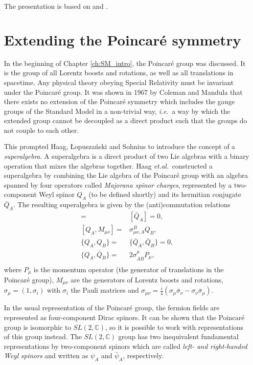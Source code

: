 The presentation is based on \cite{Batzing:2013} and \cite{Leinonen:2014}.

\section{Extending the Poincar\'{e} symmetry}
In the beginning of Chapter \ref{ch:SM_intro}, the Poincar\'{e} group was discussed. It is the group of all Lorentz boosts and rotations, as well as all translations in spacetime. Any physical theory obeying Special Relativity must be invariant under the Poincar\'{e} group. It was shown in 1967 by Coleman and Mandula \cite{PhysRev.159.1251} that there exists no extension of the Poincar\'{e} symmetry which includes the gauge groups of the Standard Model in a non-trivial way, {\it i.e.}\ a way by which the extended group cannot be decoupled as a direct product such that the groups do not couple to each other. 

This prompted Haag, \L{}opusza\'{n}ski and Sohnius \cite{Haag1975257} to introduce the concept of a {\it superalgebra}. A superalgebra is a direct product of two Lie algebras with a binary operation that mixes the algebras together. Haag {\it et.al.}\ constructed a superalgebra by combining the Lie algebra of the Poincar\'{e} group with an algebra spanned by four operators called {\it Majorana spinor charges}, represented by a two-component Weyl spinor $Q_A$ (to be defined shortly) and its hermitian conjugate $\bar Q_{\dot A}$. The resulting superalgebra is given by the (anti)commutation relations
\begin{align}
	[Q_A,P_\mu] =& [\bar Q_{\dot A}] = 0,\\
	[Q_A, M_{\mu\nu}] =& \sigma_{\mu\nu,A}^B Q_B,\\
	\{Q_A, Q_B\} =& \{\bar Q_{\dot A}, \bar Q_{\dot B} \} = 0,\\
	\{Q_A, \bar Q_{\dot B} \} =& 2\sigma^\mu_{A \dot B} P_\mu,\\
\end{align}
where $P_\mu$ is the momentum operator (the generator of translations in the Poincar\'{e} group), $M_{\mu\nu}$ are the generators of Lorentz boosts and rotations, $\sigma_\mu = (1,\sigma_i)$ with $\sigma_i$ the Pauli matrices and $\sigma_{\mu\nu} = \frac{i}{4}(\sigma_\mu \bar\sigma_\nu - \sigma_\nu \bar\sigma_\mu)$. 

In the usual representation of the Poincar\'{e} group, the fermion fields are represented as four-component Dirac spinors. It can be shown that the Poincar\'{e} group is isomorphic to $SL(2,\mathbb{C})$, so it is possible to work with representations of this group instead. The $SL(2,\mathbb{C})$ group has two inequivalent fundamental representations by two-component spinors which are called {\it left- and right-handed Weyl spinors} and written as $\psi_A$ and $\bar\psi_{\dot A}$, respectively. 

